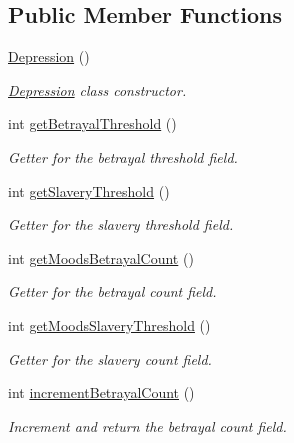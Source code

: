 \subsection*{Public Member Functions}
\begin{DoxyCompactItemize}
\item 
\hyperlink{classgameplay_1_1ai_1_1mood_1_1_depression_ad2cd5c630475dceccc3fc62592c02899}{Depression} ()
\begin{DoxyCompactList}\small\item\em \hyperlink{classgameplay_1_1ai_1_1mood_1_1_depression}{Depression} class constructor. \end{DoxyCompactList}\item 
int \hyperlink{classgameplay_1_1ai_1_1mood_1_1_mood_a766902de5008b4ff54729075fe0b66a6}{get\-Betrayal\-Threshold} ()
\begin{DoxyCompactList}\small\item\em Getter for the betrayal threshold field. \end{DoxyCompactList}\item 
int \hyperlink{classgameplay_1_1ai_1_1mood_1_1_mood_a8c5dda351cf131a2e2a30a1570e2c7e7}{get\-Slavery\-Threshold} ()
\begin{DoxyCompactList}\small\item\em Getter for the slavery threshold field. \end{DoxyCompactList}\item 
int \hyperlink{classgameplay_1_1ai_1_1mood_1_1_mood_aae8ae123bc9d3bae48e08ad15528aa5b}{get\-Moods\-Betrayal\-Count} ()
\begin{DoxyCompactList}\small\item\em Getter for the betrayal count field. \end{DoxyCompactList}\item 
int \hyperlink{classgameplay_1_1ai_1_1mood_1_1_mood_a859eb2f9bae00ce3604d0fea5a690900}{get\-Moods\-Slavery\-Threshold} ()
\begin{DoxyCompactList}\small\item\em Getter for the slavery count field. \end{DoxyCompactList}\item 
int \hyperlink{classgameplay_1_1ai_1_1mood_1_1_mood_a322adb08d4a6f7dcd0eb00c77649d2d2}{increment\-Betrayal\-Count} ()
\begin{DoxyCompactList}\small\item\em Increment and return the betrayal count field. \end{DoxyCompactList}\item 

\end{DoxyCompactItemize}
